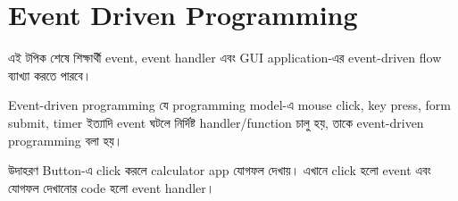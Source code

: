 \section{Event Driven Programming}

\begin{learningbox}
এই টপিক শেষে শিক্ষার্থী event, event handler এবং GUI application-এর event-driven flow ব্যাখ্যা করতে পারবে।
\end{learningbox}

\begin{definitionbox}{Event-driven programming}
যে programming model-এ mouse click, key press, form submit, timer ইত্যাদি event ঘটলে নির্দিষ্ট handler/function চালু হয়, তাকে event-driven programming বলা হয়।
\end{definitionbox}

\begin{center}
\end{center}

\begin{examplebox}{উদাহরণ}
Button-এ click করলে calculator app যোগফল দেখায়। এখানে click হলো event এবং যোগফল দেখানোর code হলো event handler।
\end{examplebox}
